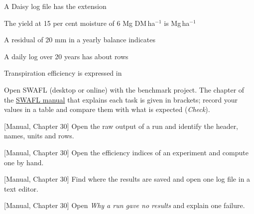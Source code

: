 \begin{exlist}
\item A Daisy log file has the extension
\item The yield at 15 per cent moisture of 6 Mg DM\,ha$^{-1}$ is Mg\,ha$^{-1}$
\item A residual of 20 mm in a yearly balance indicates
\item A daily log over 20 years has about rows
\item Transpiration efficiency is expressed in
\end{exlist}
{\small Open SWAFL (desktop or online) with the benchmark project. The chapter of the \href{https://github.com/halilunaziru73-creator/Coupled-Water-Fluxes-Pore-Scale-Dynamics-Precision-Irrigation-Mulching-Feedback-Loops/raw/main/Software/v1.1.0/SWAFL_Desktop/docs/manual_v1.1.0/SWAFL_Manual_v1.1.0.pdf}{SWAFL manual} that explains each task is given in brackets; record your values in a table and compare them with what is expected (\emph{Check}).}\par\vspace{3pt}
\begin{exlist}
\item {\color{khblue}[Manual, Chapter 30]} Open the raw output of a run and identify the header, names, units and rows.\par{}
\item {\color{khblue}[Manual, Chapter 30]} Open the efficiency indices of an experiment and compute one by hand.\par{}
\item {\color{khblue}[Manual, Chapter 30]} Find where the results are saved and open one log file in a text editor.\par{}
\item {\color{khblue}[Manual, Chapter 30]} Open \emph{Why a run gave no results} and explain one failure.\par{}
\end{exlist}
